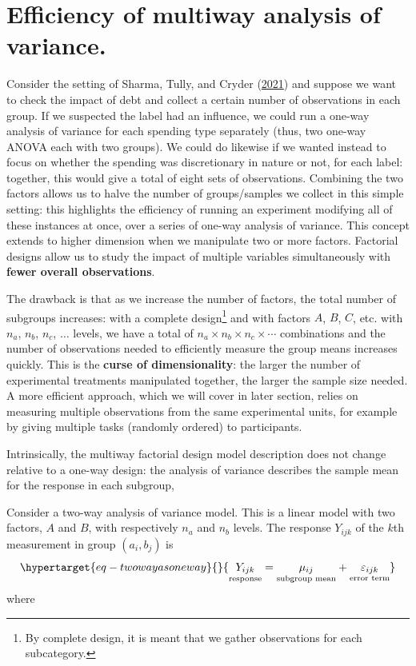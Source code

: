 \documentclass[
  11pt,
  letterpaper,
]{scrbook}
\theoremstyle{definition}
\theoremstyle{remark}
\begin{document}
\hypertarget{efficiency-of-multiway-analysis-of-variance.}{%
\section{Efficiency of multiway analysis of
variance.}\label{efficiency-of-multiway-analysis-of-variance.}}

Consider the setting of Sharma, Tully, and Cryder
(\protect\hyperlink{ref-Sharma.Tully.Cryder:2021}{2021}) and suppose we
want to check the impact of debt and collect a certain number of
observations in each group. If we suspected the label had an influence,
we could run a one-way analysis of variance for each spending type
separately (thus, two one-way ANOVA each with two groups). We could do
likewise if we wanted instead to focus on whether the spending was
discretionary in nature or not, for each label: together, this would
give a total of eight sets of observations. Combining the two factors
allows us to halve the number of groups/samples we collect in this
simple setting: this highlights the efficiency of running an experiment
modifying all of these instances at once, over a series of one-way
analysis of variance. This concept extends to higher dimension when we
manipulate two or more factors. Factorial designs allow us to study the
impact of multiple variables simultaneously with \textbf{fewer overall
observations}.

The drawback is that as we increase the number of factors, the total
number of subgroups increases: with a complete design\footnote{By
  complete design, it is meant that we gather observations for each
  subcategory.} and with factors \(A\), \(B\), \(C\), etc. with \(n_a\),
\(n_b\), \(n_c\), \(\ldots\) levels, we have a total of
\(n_a\times n_b \times n_c \times \cdots\) combinations and the number
of observations needed to efficiently measure the group means increases
quickly. This is the \textbf{curse of dimensionality}: the larger the
number of experimental treatments manipulated together, the larger the
sample size needed. A more efficient approach, which we will cover in
later section, relies on measuring multiple observations from the same
experimental units, for example by giving multiple tasks (randomly
ordered) to participants.

Intrinsically, the multiway factorial design model description does not
change relative to a one-way design: the analysis of variance describes
the sample mean for the response in each subgroup,

Consider a two-way analysis of variance model. This is a linear model
with two factors, \(A\) and \(B\), with respectively \(n_a\) and \(n_b\)
levels. The response \(Y_{ijk}\) of the \(k\)th measurement in group
\((a_i, b_j)\) is
\begin{equation}\protect\hypertarget{eq-twowayasoneway}{}{
\underset{\text{response}\vphantom{b}}{Y_{ijk}} = \underset{\text{subgroup mean}}{\mu_{ij}} + \underset{\text{error term}}{\varepsilon_{ijk}}
}\label{eq-twowayasoneway}\end{equation} where
\end{document}
